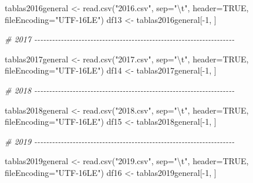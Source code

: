 \documentclass[
]{article}
\newenvironment{Shaded}{\begin{snugshade}}{\end{snugshade}}
\newcommand{\AttributeTok}[1]{\textcolor[rgb]{0.77,0.63,0.00}{#1}}
\newcommand{\CommentTok}[1]{\textcolor[rgb]{0.56,0.35,0.01}{\textit{#1}}}
\newcommand{\ConstantTok}[1]{\textcolor[rgb]{0.00,0.00,0.00}{#1}}
\newcommand{\DecValTok}[1]{\textcolor[rgb]{0.00,0.00,0.81}{#1}}
\newcommand{\FunctionTok}[1]{\textcolor[rgb]{0.00,0.00,0.00}{#1}}
\newcommand{\NormalTok}[1]{#1}
\newcommand{\OtherTok}[1]{\textcolor[rgb]{0.56,0.35,0.01}{#1}}
\newcommand{\SpecialCharTok}[1]{\textcolor[rgb]{0.00,0.00,0.00}{#1}}
\newcommand{\StringTok}[1]{\textcolor[rgb]{0.31,0.60,0.02}{#1}}
\begin{document}
\begin{Shaded}
\begin{Highlighting}[]
\NormalTok{tablas2016general }\OtherTok{\textless{}{-}} \FunctionTok{read.csv}\NormalTok{(}\StringTok{"2016.csv"}\NormalTok{, }\AttributeTok{sep=}\StringTok{"}\SpecialCharTok{\textbackslash{}t}\StringTok{"}\NormalTok{, }\AttributeTok{header=}\ConstantTok{TRUE}\NormalTok{, }\AttributeTok{fileEncoding=}\StringTok{"UTF{-}16LE"}\NormalTok{)}
\NormalTok{df13 }\OtherTok{\textless{}{-}}\NormalTok{ tablas2016general[}\SpecialCharTok{{-}}\DecValTok{1}\NormalTok{, ]}


\CommentTok{\# 2017 {-}{-}{-}{-}{-}{-}{-}{-}{-}{-}{-}{-}{-}{-}{-}{-}{-}{-}{-}{-}{-}{-}{-}{-}{-}{-}{-}{-}{-}{-}{-}{-}{-}{-}{-}{-}{-}{-}{-}{-}{-}{-}{-}{-}{-}{-}{-}{-}{-}{-}{-}{-}{-}{-}{-}{-}{-}{-}{-}{-}{-}{-}{-}{-}{-}{-}{-}{-}}

\NormalTok{tablas2017general }\OtherTok{\textless{}{-}} \FunctionTok{read.csv}\NormalTok{(}\StringTok{"2017.csv"}\NormalTok{, }\AttributeTok{sep=}\StringTok{"}\SpecialCharTok{\textbackslash{}t}\StringTok{"}\NormalTok{, }\AttributeTok{header=}\ConstantTok{TRUE}\NormalTok{, }\AttributeTok{fileEncoding=}\StringTok{"UTF{-}16LE"}\NormalTok{)}
\NormalTok{df14 }\OtherTok{\textless{}{-}}\NormalTok{ tablas2017general[}\SpecialCharTok{{-}}\DecValTok{1}\NormalTok{, ]}


\CommentTok{\# 2018 {-}{-}{-}{-}{-}{-}{-}{-}{-}{-}{-}{-}{-}{-}{-}{-}{-}{-}{-}{-}{-}{-}{-}{-}{-}{-}{-}{-}{-}{-}{-}{-}{-}{-}{-}{-}{-}{-}{-}{-}{-}{-}{-}{-}{-}{-}{-}{-}{-}{-}{-}{-}{-}{-}{-}{-}{-}{-}{-}{-}{-}{-}{-}{-}{-}{-}{-}{-}}

\NormalTok{tablas2018general }\OtherTok{\textless{}{-}} \FunctionTok{read.csv}\NormalTok{(}\StringTok{"2018.csv"}\NormalTok{, }\AttributeTok{sep=}\StringTok{"}\SpecialCharTok{\textbackslash{}t}\StringTok{"}\NormalTok{, }\AttributeTok{header=}\ConstantTok{TRUE}\NormalTok{, }\AttributeTok{fileEncoding=}\StringTok{"UTF{-}16LE"}\NormalTok{)}
\NormalTok{df15 }\OtherTok{\textless{}{-}}\NormalTok{ tablas2018general[}\SpecialCharTok{{-}}\DecValTok{1}\NormalTok{, ]}


\CommentTok{\# 2019 {-}{-}{-}{-}{-}{-}{-}{-}{-}{-}{-}{-}{-}{-}{-}{-}{-}{-}{-}{-}{-}{-}{-}{-}{-}{-}{-}{-}{-}{-}{-}{-}{-}{-}{-}{-}{-}{-}{-}{-}{-}{-}{-}{-}{-}{-}{-}{-}{-}{-}{-}{-}{-}{-}{-}{-}{-}{-}{-}{-}{-}{-}{-}{-}{-}{-}{-}{-}}

\NormalTok{tablas2019general }\OtherTok{\textless{}{-}} \FunctionTok{read.csv}\NormalTok{(}\StringTok{"2019.csv"}\NormalTok{, }\AttributeTok{sep=}\StringTok{"}\SpecialCharTok{\textbackslash{}t}\StringTok{"}\NormalTok{, }\AttributeTok{header=}\ConstantTok{TRUE}\NormalTok{, }\AttributeTok{fileEncoding=}\StringTok{"UTF{-}16LE"}\NormalTok{)}
\NormalTok{df16 }\OtherTok{\textless{}{-}}\NormalTok{ tablas2019general[}\SpecialCharTok{{-}}\DecValTok{1}\NormalTok{, ]}



\end{Highlighting}
\end{Shaded}
\end{document}

